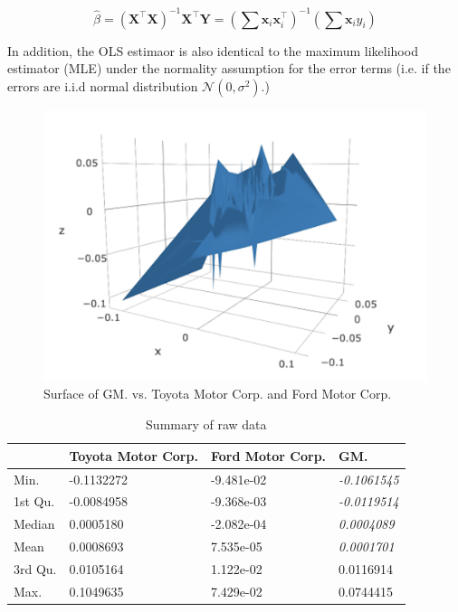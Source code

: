 $$\hat{\beta} = (\mathbf{X}^\top \mathbf{X})^{-1} \mathbf{X}^\top \mathbf{Y} = (\sum{\mathbf{x}_i\mathbf{x}_i^\top})^{-1} (\sum{\mathbf{x}_i} y_i) $$ 

In addition, the OLS estimaor is also identical to the maximum likelihood estimator (MLE) under the normality assumption for the error terms \cite{test} (i.e. if the errors are i.i.d normal distribution $\mathcal{N}(0, \sigma^2)$.) 

\begin{figure}
\includegraphics[scale=0.3]{surface}
\caption{Surface of GM. vs. Toyota Motor Corp. and Ford Motor Corp.}
\label{img:surface}
\end{figure}

\begin{table}[]
\centering
\caption{Summary of raw data}
\label{tab:rawdata}
\begin{tabular}{l|lll}
        & \textbf{Toyota Motor Corp.} & \textbf{Ford Motor Corp.} & \textbf{GM.}        \\ \hline
Min.    & -0.1132272                  & -9.481e-02                & \textit{-0.1061545} \\
1st Qu. & -0.0084958                  & -9.368e-03                & \textit{-0.0119514} \\
Median  & 0.0005180                   & -2.082e-04                & \textit{0.0004089}  \\
Mean    & 0.0008693                   & 7.535e-05                 & \textit{0.0001701}  \\
3rd Qu. & 0.0105164                   & 1.122e-02                 & 0.0116914           \\
Max.    & 0.1049635                   & 7.429e-02                 & 0.0744415          
\end{tabular}
\end{table}

